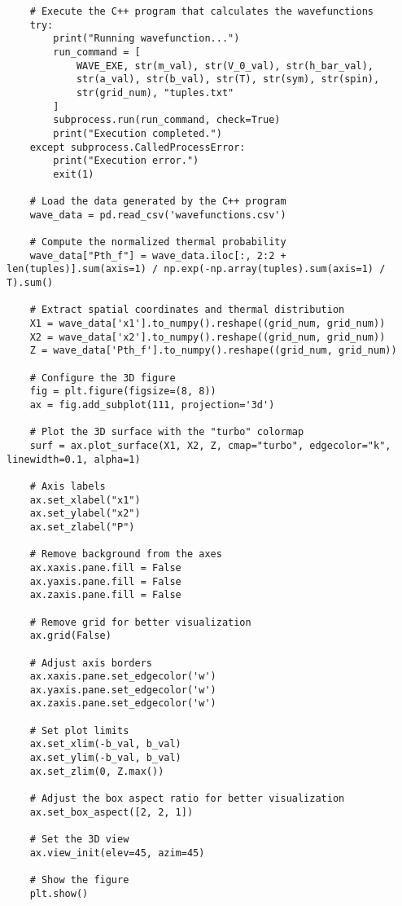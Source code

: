 \documentclass[11pt]{article}
\begin{document}
\begin{verbatim}
    # Execute the C++ program that calculates the wavefunctions
    try:
        print("Running wavefunction...")
        run_command = [
            WAVE_EXE, str(m_val), str(V_0_val), str(h_bar_val),
            str(a_val), str(b_val), str(T), str(sym), str(spin),
            str(grid_num), "tuples.txt"
        ]
        subprocess.run(run_command, check=True)
        print("Execution completed.")
    except subprocess.CalledProcessError:
        print("Execution error.")
        exit(1)

    # Load the data generated by the C++ program
    wave_data = pd.read_csv('wavefunctions.csv')

    # Compute the normalized thermal probability
    wave_data["Pth_f"] = wave_data.iloc[:, 2:2 + len(tuples)].sum(axis=1) / np.exp(-np.array(tuples).sum(axis=1) / T).sum()

    # Extract spatial coordinates and thermal distribution
    X1 = wave_data['x1'].to_numpy().reshape((grid_num, grid_num))
    X2 = wave_data['x2'].to_numpy().reshape((grid_num, grid_num))
    Z = wave_data['Pth_f'].to_numpy().reshape((grid_num, grid_num))

    # Configure the 3D figure
    fig = plt.figure(figsize=(8, 8))
    ax = fig.add_subplot(111, projection='3d')

    # Plot the 3D surface with the "turbo" colormap
    surf = ax.plot_surface(X1, X2, Z, cmap="turbo", edgecolor="k", linewidth=0.1, alpha=1)

    # Axis labels
    ax.set_xlabel("x1")
    ax.set_ylabel("x2")
    ax.set_zlabel("P")

    # Remove background from the axes
    ax.xaxis.pane.fill = False
    ax.yaxis.pane.fill = False
    ax.zaxis.pane.fill = False

    # Remove grid for better visualization
    ax.grid(False)

    # Adjust axis borders
    ax.xaxis.pane.set_edgecolor('w')
    ax.yaxis.pane.set_edgecolor('w')
    ax.zaxis.pane.set_edgecolor('w')

    # Set plot limits
    ax.set_xlim(-b_val, b_val)
    ax.set_ylim(-b_val, b_val)
    ax.set_zlim(0, Z.max())

    # Adjust the box aspect ratio for better visualization
    ax.set_box_aspect([2, 2, 1])

    # Set the 3D view
    ax.view_init(elev=45, azim=45)

    # Show the figure
    plt.show()
\end{verbatim}
\end{document}
